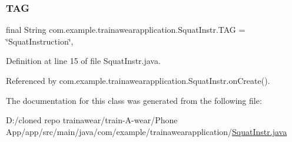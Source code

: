 \subsubsection{\texorpdfstring{TAG}{TAG}}
{\footnotesize\ttfamily final String com.\+example.\+trainawearapplication.\+Squat\+Instr.\+T\+AG = \char`\"{}Squat\+Instruction\char`\"{}\hspace{0.3cm}{\ttfamily [static]}, {\ttfamily [private]}}



Definition at line 15 of file Squat\+Instr.\+java.



Referenced by com.\+example.\+trainawearapplication.\+Squat\+Instr.\+on\+Create().



The documentation for this class was generated from the following file\+:\begin{DoxyCompactItemize}
\item 
D\+:/cloned repo trainawear/train-\/\+A-\/wear/\+Phone App/app/src/main/java/com/example/trainawearapplication/\mbox{\hyperlink{_squat_instr_8java}{Squat\+Instr.\+java}}\end{DoxyCompactItemize}
